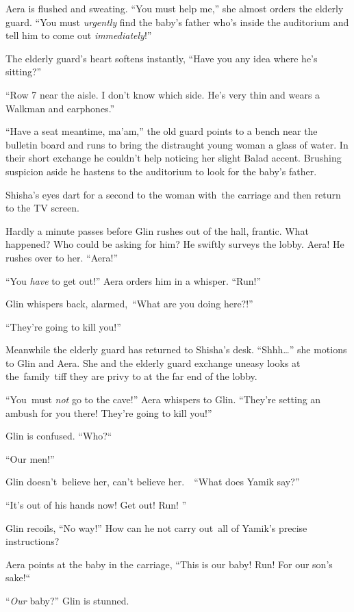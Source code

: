 \documentclass[twoside,11pt]{book}
\begin{document}
Aera is flushed and sweating. ``You must help me,'' she almost orders the elderly guard.
``You must \textit{urgently} find the baby's father who's inside the auditorium and tell him to come out
\textit{immediately}!'' 

The elderly guard's heart softens instantly, ``Have you any idea where he's sitting?''

``Row 7 near the aisle. I don't know which side. He's very thin and wears a Walkman and
earphones.'' 

``Have a seat meantime, ma'am,'' the old guard points to a bench near the bulletin board and runs to bring
the distraught young woman a glass of water. In their short exchange he couldn't help noticing her slight Balad accent.
Brushing suspicion aside he hastens to the auditorium to look for the baby's father.

Shisha's eyes dart for a second to the woman with{\ }the carriage and then
return to the TV screen.

Hardly a minute passes before Glin rushes out of the hall, frantic. What happened? Who could be asking for him? He
swiftly surveys the lobby. Aera! He rushes over to her. ``Aera!'' 

``You \textit{have} to get out!'' Aera orders him in a whisper.
``Run!'' 

Glin whispers back, alarmed{,\ }{}``What are you doing here?!'' 

``They're going to kill you!''

Meanwhile the elderly guard has returned to Shisha's desk. ``Shhh{\dots}'' she motions to Glin
and Aera. She and the elderly guard exchange{ u}neasy looks at the~family~tiff
they are privy to at the far end of the lobby.\textbf{\ }

``You\textit{\ }must\textit{ not} go to the cave!'' Aera whispers to Glin.
``They're setting an ambush for you there! They're going to kill you!'' 

Glin is confused. ``Who?``\ \ ~

``Our men!'' 

Glin doesn't\ believe her, can't believe her.\ \ ``What does Yamik say?'' 

``It's out of his hands now! Get out! Run! '' 

Glin recoils, ``No way!'' How can he not carry out~all of Yamik's precise instructions? 

Aera points at the baby in the carriage, ``This is our baby! Run! For our son's sake!``~ 

``\textit{Our }baby?'' Glin is stunned.
\end{document}
